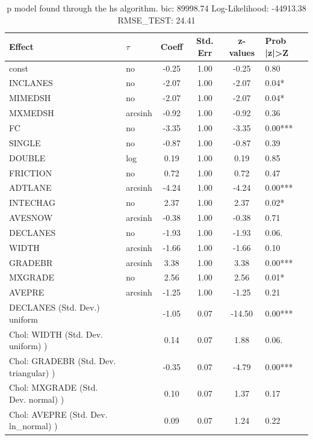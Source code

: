 \begin{table}
	\caption{p model found through the hs algorithm. bic: 89998.74 Log-Likelihood: -44913.38 RMSE_TEST: 24.41}
	\begin{center}
		\begin{tabular}{|l|l|c|c|c|l|}
			\hline
			Effect & $\tau$ & Coeff & Std. Err & z-values & Prob |z|>Z \\
			\hline
			const & no & -0.25 & 1.00 & -0.25 & 0.80 \\
			\hline
			INCLANES & no & -2.07 & 1.00 & -2.07 & 0.04* \\
			\hline
			MIMEDSH & no & -2.07 & 1.00 & -2.07 & 0.04* \\
			\hline
			MXMEDSH & arcsinh & -0.92 & 1.00 & -0.92 & 0.36 \\
			\hline
			FC & no & -3.35 & 1.00 & -3.35 & 0.00*** \\
			\hline
			SINGLE & no & -0.87 & 1.00 & -0.87 & 0.39 \\
			\hline
			DOUBLE & log & 0.19 & 1.00 & 0.19 & 0.85 \\
			\hline
			FRICTION & no & 0.72 & 1.00 & 0.72 & 0.47 \\
			\hline
			ADTLANE & arcsinh & -4.24 & 1.00 & -4.24 & 0.00*** \\
			\hline
			INTECHAG & no & 2.37 & 1.00 & 2.37 & 0.02* \\
			\hline
			AVESNOW & arcsinh & -0.38 & 1.00 & -0.38 & 0.71 \\
			\hline
			DECLANES & no & -1.93 & 1.00 & -1.93 & 0.06. \\
			\hline
			WIDTH & arcsinh & -1.66 & 1.00 & -1.66 & 0.10 \\
			\hline
			GRADEBR & arcsinh & 3.38 & 1.00 & 3.38 & 0.00*** \\
			\hline
			MXGRADE & no & 2.56 & 1.00 & 2.56 & 0.01* \\
			\hline
			AVEPRE & arcsinh & -1.25 & 1.00 & -1.25 & 0.21 \\
			\hline
			DECLANES (Std. Dev.) uniform &  & -1.05 & 0.07 & -14.50 & 0.00*** \\
			\hline
			 Chol: WIDTH (Std. Dev. uniform) ) &  & 0.14 & 0.07 & 1.88 & 0.06. \\
			\hline
			 Chol: GRADEBR (Std. Dev. triangular) ) &  & -0.35 & 0.07 & -4.79 & 0.00*** \\
			\hline
			 Chol: MXGRADE (Std. Dev. normal) ) &  & 0.10 & 0.07 & 1.37 & 0.17 \\
			\hline
			 Chol: AVEPRE (Std. Dev. ln_normal) ) &  & 0.09 & 0.07 & 1.24 & 0.22 \\

\end{tabular}
\end{center}
\end{table}
